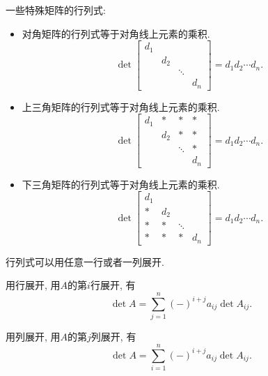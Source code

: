一些特殊矩阵的行列式:
\begin{itemize}
    \item 对角矩阵的行列式等于对角线上元素的乘积.
    \begin{equation}
      \det \begin{bmatrix}
        d_1 & & & \\
        & d_2 & & \\
        & & \ddots & \\
        & & & d_n
        \end{bmatrix} = d_1 d_2 \cdots d_n.
    \end{equation}

    \item 上三角矩阵的行列式等于对角线上元素的乘积.
    \begin{equation}
        \det \begin{bmatrix}
            d_1 & * & * & * \\
            & d_2 & * & * \\
            & & \ddots & * \\
            & & & d_n
            \end{bmatrix} = d_1 d_2 \cdots d_n.
    \end{equation}

    \item 下三角矩阵的行列式等于对角线上元素的乘积.
    \begin{equation}
        \det \begin{bmatrix}
            d_1 & & & \\
            * & d_2 & & \\
            * & * & \ddots & \\
            * & * & * & d_n
            \end{bmatrix} = d_1 d_2 \cdots d_n.
    \end{equation}
\end{itemize}

\begin{proposition}
    行列式可以用任意一行或者一列展开.

    用行展开, 用$A$的第$i$行展开, 有
    \begin{equation}
      \det A = \sum_{j=1}^{n} \left( - \right) ^{i + j} a_{i j} \det A_{i j}.
    \end{equation}

    用列展开, 用$A$的第$j$列展开, 有
    \begin{equation}
      \det A = \sum_{i=1}^{n} \left( - \right) ^{i + j} a_{i j} \det A_{i j}.
    \end{equation}
\end{proposition}

